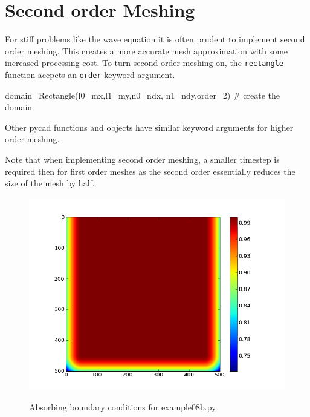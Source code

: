 \section{Second order Meshing}
For stiff problems like the wave equation it is often prudent to implement
second order meshing. This creates a more accurate mesh approximation with some
increased processing cost. To turn second order meshing on, the \verb!rectangle!
function accpets an \verb!order! keyword argument.
\begin{python}
domain=Rectangle(l0=mx,l1=my,n0=ndx, n1=ndy,order=2) # create the domain
\end{python}
Other pycad functions and objects have similar keyword arguments for higher
order meshing.

Note that when implementing second order meshing, a smaller timestep is required
then for first order meshes as the second order essentially reduces the size of
the mesh by half.

\begin{figure}[ht]
 \centering
 \includegraphics[width=5in]{figures/ex08babc.png}
 \label{fig:abconds}
 \caption{Absorbing boundary conditions for example08b.py}
\end{figure}

